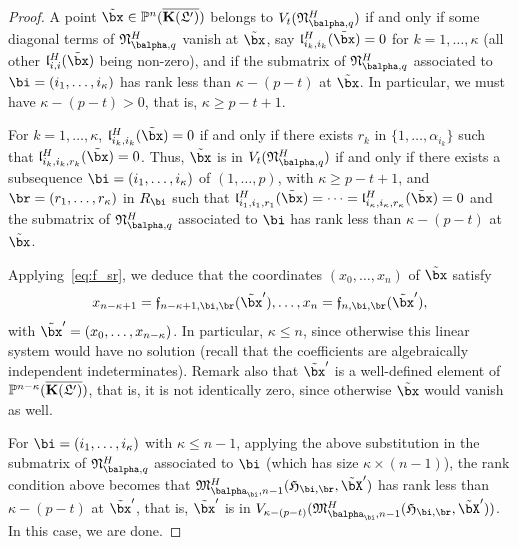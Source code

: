 \documentclass[12pt]{article}
\begin{document}
\begin{proof}
  A point $\tilde\bx \in \P^n(\KKGpbar)$ belongs to
  $V_t(\mathfrak{N}^H_{\balpha,q})$ if and only if some diagonal terms
  of $\mathfrak{N}^H_{\balpha,q}$ vanish at $\tilde\bx$, say
  $\mathfrak{l}^H_{i_k,i_k}(\tilde\bx)=0$ for $k=1,\dots,\kappa$ (all
  other $\mathfrak{l}^H_{i,i}(\tilde\bx)$ being non-zero), and
  if the submatrix of $\mathfrak{N}^H_{\balpha,q}$ associated to
  $\bi=(i_1,\dots,i_\kappa)$ has rank less than $\kappa-(p-t)$ at $\tilde
  \bx$.  In particular, we must have
  $\kappa-(p-t) > 0$, that is, $\kappa \ge p-t+1$.

  For $k=1,\dots,\kappa$, $\mathfrak{l}^H_{i_k,i_k}(\tilde\bx)=0$ if
  and only if there exists $r_k$ in $\{1,\dots,\alpha_{i_k}\}$ such
  that $\mathfrak{l}^H_{i_k,i_k,r_k}(\tilde\bx)=0$. Thus, $\tilde\bx$
  is in $V_t(\mathfrak{N}^H_{\balpha,q})$ if and only if there exists
  a subsequence $\bi=(i_1,\dots,i_\kappa)$  of $(1,\dots,p)$, with
  $\kappa \ge p-t+1$, and $\br=(r_1,\dots,r_\kappa)$ in $R_\bi$ such that
  $\mathfrak{l}^H_{i_1,i_1,r_1}(\tilde\bx)=\cdots=\mathfrak{l}^H_{i_\kappa,i_\kappa,r_\kappa}(\tilde\bx)=0$
  and the submatrix of $\mathfrak{N}^H_{\balpha,q}$ associated to $\bi$
  has rank less than $\kappa-(p-t)$ at $\tilde\bx$.  

  Applying~\eqref{eq:f_sr}, we deduce that the coordinates $(x_0,\dots,x_n)$ 
  of $\tilde \bx$ satisfy
  \begin{align*}
    x_{n-\kappa+1}=\mathfrak{f}_{n-\kappa+1,\bi,\br}(\tilde\bx'),\dots,x_{n}=\mathfrak{f}_{n,\bi,\br}(\tilde\bx'),
  \end{align*}
  with $\tilde\bx'=(x_0,\dots,x_{n-\kappa})$.  In particular, $\kappa
  \le n$, since otherwise this linear system would have no solution
  (recall that the coefficients are algebraically independent
  indeterminates). Remark also that $\tilde\bx'$ is a well-defined
  element of $\mathbb{P}^{n-\kappa}(\overline{\mathbf{K}(\mathfrak{L}')})$, that is, it is not identically
  zero, since otherwise $\tilde\bx$ would vanish as well.

  For $\bi=(i_1,\dots,i_\kappa)$ with $\kappa \le n-1$, applying the above
  substitution in the submatrix of $\mathfrak{N}^H_{\balpha,q}$
  associated to $\bi$ (which has size $\kappa \times (n-1)$), the rank
  condition above becomes that
  $\mathfrak{M}^H_{\balpha_\bi,n-1}(\mathfrak{H}_{\bi,\br},\tilde\bX')$
  has rank less than $\kappa-(p-t)$ at $\tilde \bx'$, that is, $\tilde
  \bx'$ is in
  $V_{\kappa-(p-t)}(\mathfrak{M}^H_{\balpha_\bi,n-1}(\mathfrak{H}_{\bi,\br},\tilde\bX'))$.
  In this case, we are done.


\end{proof}
\end{document}
